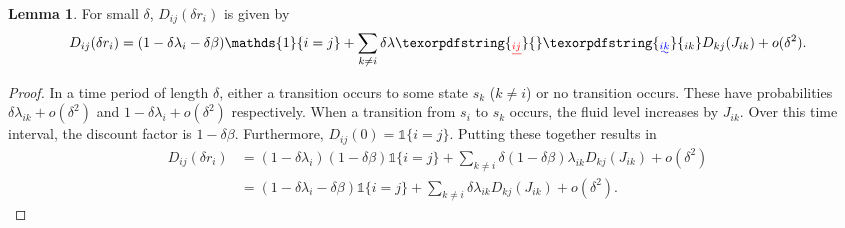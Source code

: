 \documentclass[a4paper]{thesis}
\theoremstyle{definition}
\newtheorem{lemma}{Lemma}[chapter]  %
\providecommand{\DIFaddtex}[1]{{\protect\color{blue}\uwave{#1}}} %
\providecommand{\DIFdeltex}[1]{{\protect\color{red}\sout{#1}}}                      %
\providecommand{\DIFaddbegin}{} %
\providecommand{\DIFaddend}{} %
\providecommand{\DIFdelbegin}{} %
\providecommand{\DIFdelend}{} %
\providecommand{\DIFadd}[1]{\texorpdfstring{\DIFaddtex{#1}}{#1}} %
\providecommand{\DIFdel}[1]{\texorpdfstring{\DIFdeltex{#1}}{}} %
\newcommand{\DIFscaledelfig}{0.5}
\newlength{\DIFdelgraphicswidth} %
\newlength{\DIFdelgraphicsheight} %
\newcommand{\DIFaddincludegraphics}[2][]{{\color{blue}\fbox{\DIFOincludegraphics[#1]{#2}}}} %
\newcommand{\DIFdelincludegraphics}[2][]{%
	\sbox{\DIFdelgraphicsbox}{\DIFOincludegraphics[#1]{#2}}%
	\settoboxwidth{\DIFdelgraphicswidth}{\DIFdelgraphicsbox} %
	\settoboxtotalheight{\DIFdelgraphicsheight}{\DIFdelgraphicsbox} %
	\scalebox{\DIFscaledelfig}{%
		\parbox[b]{\DIFdelgraphicswidth}{\usebox{\DIFdelgraphicsbox}\\[-\baselineskip] \rule{\DIFdelgraphicswidth}{0em}}\llap{\resizebox{\DIFdelgraphicswidth}{\DIFdelgraphicsheight}{%
				\setlength{\unitlength}{\DIFdelgraphicswidth}%
				\begin{picture}(1,1)%
				\thicklines\linethickness{2pt} %
				{\color[rgb]{1,0,0}\put(0,0){\framebox(1,1){}}}%
				{\color[rgb]{1,0,0}\put(0,0){\line( 1,1){1}}}%
				{\color[rgb]{1,0,0}\put(0,1){\line(1,-1){1}}}%
				\end{picture}%
			}\hspace*{3pt}}} %
} %
\DeclareRobustCommand{\DIFaddbegin}{\DIFOaddbegin \let\includegraphics\DIFaddincludegraphics} %
\DeclareRobustCommand{\DIFaddend}{\DIFOaddend \let\includegraphics\DIFOincludegraphics} %
\DeclareRobustCommand{\DIFdelbegin}{\DIFOdelbegin \let\includegraphics\DIFdelincludegraphics} %
\DeclareRobustCommand{\DIFdelend}{\DIFOaddend \let\includegraphics\DIFOincludegraphics} %
\begin{document}
	\begin{lemma}\label{lemma:MmfmDiscountsInfinitisimal}
		For small $\delta$, $D_{ij}(\delta r_i)$ is given by
		\[
		D_{ij}(\delta r_i)=(1-\delta\lambda_i-\delta\beta)\mathds{1}\{i=j\}+\sum\limits_{k\neq i}\delta\lambda\DIFdelbegin \DIFdel{_{ij}}\DIFdelend \DIFaddbegin \DIFadd{_{ik}}\DIFaddend D_{kj}(J_{ik})+o(\delta^2).
		\]
		\begin{proof}
			In a time period of length $\delta$, either a transition occurs to some state $s_k$ ($k\neq i$) or no transition occurs.
			These have probabilities $\delta\lambda_{ik}+o(\delta^2)$ and $1-\delta\lambda_i+o(\delta^2)$ respectively.
			When a transition from $s_i$ to $s_k$ occurs, the fluid level increases by $J_{ik}$.
			Over this time interval, the discount factor is $1-\delta\beta$.
			Furthermore, $D_{ij}(0)=\mathds{1}\{i=j\}$.
			Putting these together results in
			\[
			\DIFdelbegin %
			\DIFdelend \DIFaddbegin \begin{split}
			D_{ij}(\delta r_i)&=(1-\delta\lambda_i)(1-\delta\beta)\mathds{1}\{i=j\}+\sum\limits_{k\neq i}\delta(1-\delta\beta)\lambda_{ik}D_{kj}(J_{ik})+o(\delta^2)\\
			&=(1-\delta\lambda_i-\delta\beta)\mathds{1}\{i=j\}+\sum\limits_{k\neq i}\delta\lambda_{ik}D_{kj}(J_{ik})+o(\delta^2).
			\end{split}
			\DIFaddend \]
		\end{proof}
	\end{lemma}
\end{document}
